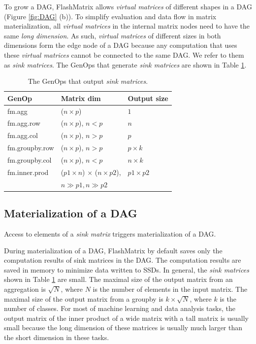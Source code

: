 To grow a DAG, FlashMatrix allows \textit{virtual matrices} of different shapes
in a DAG (Figure \ref{fig:DAG} (b)). To simplify evaluation and data flow in
matrix materialization, all \textit{virtual matrices} in the internal matrix
nodes need to have the same \textit{long dimension}. As such, \textit{virtual
matrices} of different sizes in both dimensions form the edge node of a DAG because
any computation that uses these \textit{virtual matrices} cannot be connected
to the same DAG.  We refer to them as \textit{sink matrices}. The GenOps that
generate \textit{sink matrices} are shown in Table \ref{tbl:sink}.

\begin{table}
\begin{center}
\footnotesize
\begin{tabular}{|l|l|l|}
\hline
GenOp & Matrix dim & Output size \\
\hline
fm.agg & ($n \times p$) & $1$ \\
\hline
fm.agg.row & ($n \times p$), $n < p$ & $n$ \\
\hline
fm.agg.col & ($n \times p$), $n > p$ & $p$ \\
\hline
fm.groupby.row & ($n \times p$), $n > p$ & $p \times k$ \\
\hline
fm.groupby.col & ($n \times p$), $n < p$ & $n \times k$ \\
\hline
fm.inner.prod & ($p1 \times n$) $\times$ ($n \times p2$), & $p1 \times p2$ \\
			  & $n \gg p1, n \gg p2$ &  \\
\hline
\end{tabular}
\normalsize
\end{center}
\caption{The GenOps that output \textit{sink matrices}.}
\label{tbl:sink}
\end{table}

\subsection{Materialization of a DAG} \label{sec:materialize}
Access to elements of a \textit{sink matrix} triggers materialization of a DAG.

During materialization of a DAG, FlashMatrix by default saves only the computation
results of sink matrices in the DAG. The computation results are saved in memory
to minimize data written to SSDs. In general, the \textit{sink matrices} shown
in Table \ref{tbl:sink} are small. The maximal size of the output matrix from
an aggregation is $\sqrt{N}$, where $N$ is the number of elements in the input
matrix. The maximal size of the output matrix from a groupby is $k \times \sqrt{N}$,
where $k$ is the number of classes.
For most of machine learning and data analysis tasks, the output matrix of
the inner product of a wide matrix with a tall matrix is usually small because
the long dimension of these matrices is usually much larger than the short
dimension in these tasks.

